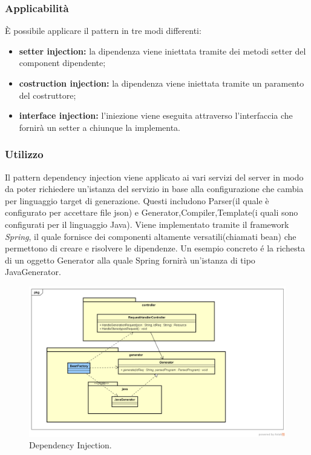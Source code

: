 \subsubsection{Applicabilità} È possibile applicare il pattern in tre modi differenti:
\begin{itemize}
	\item \textbf{setter injection:} la dipendenza viene iniettata tramite dei metodi setter del component dipendente;
	\item \textbf{costruction injection:} la dipendenza viene iniettata tramite un paramento del costruttore;
	\item \textbf{interface injection:} l'iniezione viene eseguita attraverso l'interfaccia che fornirà un setter a chiunque la implementa.
\end{itemize}

\subsubsection{Utilizzo}
Il pattern dependency injection viene applicato ai vari servizi del server in modo da poter richiedere un'istanza del servizio in base alla configurazione che cambia per linguaggio target di generazione.
Questi includono Parser(il quale è configurato per accettare file json) e Generator,Compiler,Template(i quali sono configurati per il linguaggio Java).
Viene implementato tramite il framework \emph{Spring}, il quale fornisce dei componenti altamente versatili(chiamati bean) che permettono di creare e risolvere le dipendenze.
Un esempio concreto é la richesta di un oggetto Generator alla quale Spring fornirà un'istanza di tipo JavaGenerator.

\begin{figure}[H] \label{fig:injector}
	\includegraphics[scale=0.4]{img/depExample.png}
	\caption{Dependency Injection.}
\end{figure}

